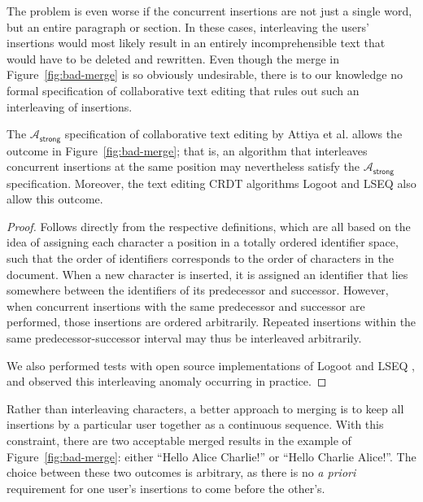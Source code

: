 The problem is even worse if the concurrent insertions are not just a single word, but an entire paragraph or section.
In these cases, interleaving the users' insertions would most likely result in an entirely incomprehensible text that would have to be deleted and rewritten.
Even though the merge in Figure~\ref{fig:bad-merge} is so obviously undesirable, there is to our knowledge no formal specification of collaborative text editing that rules out such an interleaving of insertions.

\begin{theorem}\label{thm:attiya-allows-interleaving}
    The $\mathcal{A}_\textsf{strong}$ specification of collaborative text editing by Attiya et al. \cite{Attiya:2016kh} allows the outcome in Figure~\ref{fig:bad-merge}; that is, an algorithm that interleaves concurrent insertions at the same position may nevertheless satisfy the $\mathcal{A}_\textsf{strong}$ specification.
    Moreover, the text editing CRDT algorithms Logoot \cite{Weiss:2009ht,Weiss:2010hx} and LSEQ \cite{Nedelec:2016eo,Nedelec:2013ky} also allow this outcome.
\end{theorem}
\begin{proof}
    Follows directly from the respective definitions, which are all based on the idea of assigning each character a position in a totally ordered identifier space, such that the order of identifiers corresponds to the order of characters in the document.
    When a new character is inserted, it is assigned an identifier that lies somewhere between the identifiers of its predecessor and successor.
    However, when concurrent insertions with the same predecessor and successor are performed, those insertions are ordered arbitrarily.
    Repeated insertions within the same predecessor-successor interval may thus be interleaved arbitrarily.

    We also performed tests with open source implementations of Logoot \cite{AhmedNacer:2011ke,ReplicationBenchmark} and LSEQ \cite{LSEQTree,Nedelec:2016eo}, and observed this interleaving anomaly occurring in practice.
\end{proof}

Rather than interleaving characters, a better approach to merging is to keep all insertions by a particular user together as a continuous sequence.
With this constraint, there are two acceptable merged results in the example of Figure~\ref{fig:bad-merge}: either ``Hello Alice Charlie!'' or ``Hello Charlie Alice!''.
The choice between these two outcomes is arbitrary, as there is no \emph{a priori} requirement for one user's insertions to come before the other's.

